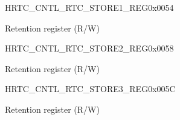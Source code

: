 \begin{register}{H}{RTC\_CNTL\_RTC\_STORE1\_REG}{0x{}0054}\label{regdesc:RTCCNTLRTCSTORE1REG}
%
\regnewline%
\begin{regdesc}\begin{reglist}
\label{fielddesc:RTCCNTLRTCSCRATCH1}\item [RTC\_CNTL\_RTC\_SCRATCH1] Retention register (R/W)
\end{reglist}\end{regdesc}
\end{register}


\begin{register}{H}{RTC\_CNTL\_RTC\_STORE2\_REG}{0x{}0058}\label{regdesc:RTCCNTLRTCSTORE2REG}
%
\regnewline%
\begin{regdesc}\begin{reglist}
\label{fielddesc:RTCCNTLRTCSCRATCH2}\item [RTC\_CNTL\_RTC\_SCRATCH2] Retention register (R/W)
\end{reglist}\end{regdesc}
\end{register}


\begin{register}{H}{RTC\_CNTL\_RTC\_STORE3\_REG}{0x{}005C}\label{regdesc:RTCCNTLRTCSTORE3REG}
%
\regnewline%
\begin{regdesc}\begin{reglist}
\label{fielddesc:RTCCNTLRTCSCRATCH3}\item [RTC\_CNTL\_RTC\_SCRATCH3] Retention register (R/W)
\end{reglist}\end{regdesc}
\end{register}


